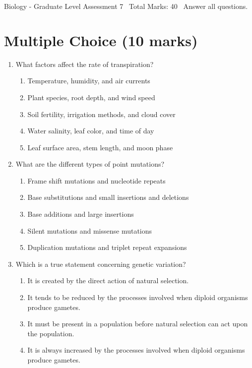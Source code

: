 \documentclass[12pt]{article}
\begin{document}
\begin{center}
Biology - Graduate Level Assessment 7 \
Total Marks: 40 \
Answer all questions.
\end{center}

\section*{Multiple Choice (10 marks)}
\begin{enumerate}[label=\arabic*.]
\item What factors affect the rate of transpiration?
\begin{enumerate}[label=(\alph*)]
    \item Temperature, humidity, and air currents
    \item Plant species, root depth, and wind speed
    \item Soil fertility, irrigation methods, and cloud cover
    \item Water salinity, leaf color, and time of day
    \item Leaf surface area, stem length, and moon phase
\end{enumerate}
\item What are the different types of point mutations?
\begin{enumerate}[label=(\alph*)]
    \item Frame shift mutations and nucleotide repeats
    \item Base substitutions and small insertions and deletions
    \item Base additions and large insertions
    \item Silent mutations and missense mutations
    \item Duplication mutations and triplet repeat expansions
\end{enumerate}
\item Which is a true statement concerning genetic variation?
\begin{enumerate}[label=(\alph*)]
    \item It is created by the direct action of natural selection.
    \item It tends to be reduced by the processes involved when diploid organisms produce gametes.
    \item It must be present in a population before natural selection can act upon the population.
    \item It is always increased by the processes involved when diploid organisms produce gametes.

\end{enumerate}
\end{enumerate}
\end{document}

